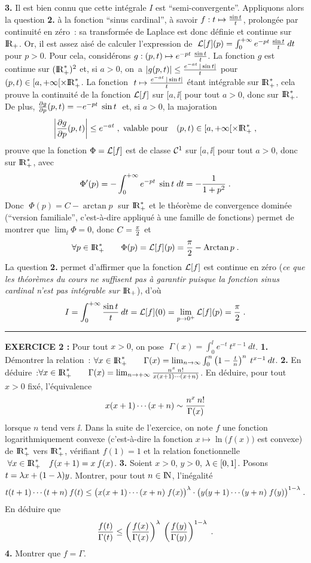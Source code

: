 \documentclass{article}
\begin{document}
\msk
{\bf 3.} Il est bien connu que cette int\'egrale $I$ est ``semi-convergente''.
Appliquons alors la question {\bf 2.} \`a la fonction ``sinus cardinal'', \`a savoir $f:t\mapsto{\sin t\over t}$, prolong\'ee par continuit\'e en z\'ero~: sa transform\'ee de Laplace est donc d\'efinie et continue sur ${\rm I\kern-0.6mm R}_+$. Or, il est assez ais\'e de calculer l'expression de $\;{\cal L}[f](p)=\int_0^{+\infty}e^{-pt}\>{\sin t\over t}\>dt\;$ pour $p>0$.\msk\sect
Pour cela, consid\'erons $g:(p,t)\mapsto e^{-pt}\;{\sin t\over t}$. La fonction $g$ est
continue sur
$({\rm I\kern-0.6mm R}_+^*)^2$ et, si $a>0$, on~a $|g(p,t)|\le{e^{-at}\>|\sin t|\over t}$ pour
$(p,t)\in[a,+\infty[\times{\rm I\kern-0.6mm R}_+^*$. La fonction $\;t\mapsto{e^{-at}\>|\sin t|\over t}$
\'etant int\'egrable sur ${\rm I\kern-0.6mm R}_+^*$, cela prouve la continuit\'e de la fonction ${\cal L}[f]$ sur $[a,\ii[$
pour tout $a>0$, donc sur ${\rm I\kern-0.6mm R}_+^*$.\ssk\sect
De plus, ${\partial g\over\partial p}(p,t)=-e^{-pt}\;\sin t\;$ et, si $a>0$, la majoration\vv
$$\left|{\partial g\over\partial p}(p,t)\right|\le e^{-at}\;,\;\hbox{valable pour}\quad
  (p,t)\in[a,+\infty[\times{\rm I\kern-0.6mm R}_+^*\;,$$
prouve que la fonction $\Phi={\cal L}[f]$ est de classe ${\cal C}^1$ sur $[a,\ii[$ pour tout $a>0$,
donc sur ${\rm I\kern-0.6mm R}_+^*$, avec\vv
$$\Phi'(p)=-\int_0^{+\infty}e^{-pt}\;\sin t\;dt=-{1\over1+p^2}\;.$$
Donc $\;\Phi(p)=C-\arctan p\;$ sur ${\rm I\kern-0.6mm R}_+^*$ et le th\'eor\`eme de convergence domin\'ee
(``version familiale'', c'est-\`a-dire appliqu\'e \`a une famille de fonctions) permet de montrer que $\lim_{\ii}\Phi=0$, donc
$C={\pi\over2}$ et $$\forall p\in{\rm I\kern-0.6mm R}_+^*\qquad \Phi(p)={\cal L}[f](p)={\pi\over2}-\mathop{\rm Arctan}\nolimits p\;.$$
La question {\bf 2.} permet d'affirmer que la fonction ${\cal L}[f]$ est continue en z\'ero ({\it ce que les th\'eor\`emes du cours ne suffisent pas \`a garantir puisque la fonction sinus cardinal n'est pas int\'egrable sur ${\rm I\kern-0.6mm R}_+$}), d'o\`u\vv
$$I=\int_0^{+\infty}{\sin t\over t}\>dt={\cal L}[f](0)=\lim_{p\rightarrow0^+}{\cal L}[f](p)={\pi\over2}\;.$$


\bsk
\hrule
\bsk

{\bf EXERCICE 2 :}\msk
Pour tout $x>0$, on pose $\;\Gamma(x)=\int_0^{\ii}e^{-t}\>t^{x-1}\>dt$.\msk
{\bf 1.} D\'emontrer la relation~: \qquad $\forall x\in{\rm I\kern-0.6mm R}_+^*\qquad\Gamma(x)=\lim_{n\rightarrow\infty}\int_0^n\left(1-{t\over n}\right)^n\>t^{x-1}\>dt$.\msk
{\bf 2.} En d\'eduire~:\qquad$\forall x\in{\rm I\kern-0.6mm R}_+^*\qquad \Gamma(x)=\lim_{n\rightarrow+\infty}{n^x\;n!\over x(x+1)\cdots(x+n)}$.\msk\sect
En d\'eduire, pour tout $x>0$ fix\'e, l'\'equivalence\vv
$$x(x+1)\cdots(x+n)\sim{n^x\>n!\over\Gamma(x)}$$
lorsque $n$ tend vers $\ii$.\msk
Dans la suite de l'exercice, on note  $f$ une fonction logarithmiquement convexe (c'est-\`a-dire
la fonction $x\mapsto\ln\big(f(x)\big)$ est convexe) de ${\rm I\kern-0.6mm R}_+^*$ vers ${\rm I\kern-0.6mm R}_+^*$, v\'erifiant $f(1)=1$ et
la relation fonctionnelle $\;\forall x\in{\rm I\kern-0.6mm R}_+^*\quad f(x+1)=x\>f(x)$.\msk
{\bf 3.} Soient $x>0$, $y>0$, $\lambda\in[0,1]$. Posons $t=\lambda x+(1-\lambda)y$.
Montrer, pour tout $n\in{\rm I\kern-0.5mm N}$, l'in\'egalit\'e\vv
$$t(t+1)\cdots(t+n)\>f(t)\le\big(x(x+1)\cdots(x+n)\;f(x)\big)
  ^{\lambda}\cdot\big(y(y+1)\cdots(y+n)\;f(y)\big)^{1-\lambda}\;.$$\ssk\sect
En d\'eduire que\vvvv
$${f(t)\over\Gamma(t)}\le\left({f(x)\over\Gamma(x)}\right)^{\lambda}\>
  \left({f(y)\over\Gamma(y)}\right)^{1-\lambda}\;.$$\ssk
{\bf 4.} Montrer que $f=\Gamma$.
\end{document}
